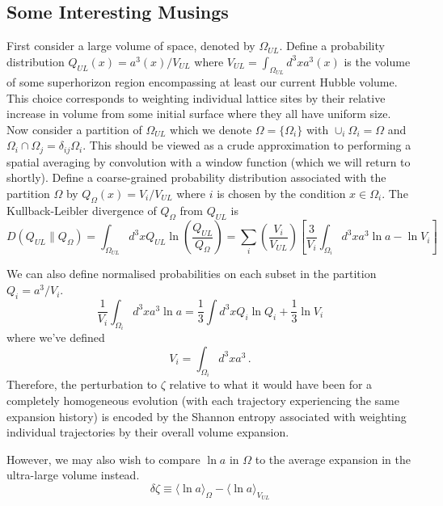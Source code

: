 \documentclass[11pt,a4paper]{article}
\begin{document}
\subsection{Some Interesting Musings}
First consider a large volume of space, denoted by $\Omega_{UL}$.
Define a probability distribution $Q_{UL}(x) = a^3(x) / V_{UL}$ where $V_{UL} = \int_{\Omega_{UL}}d^3x a^3(x)$ is the volume of some superhorizon region encompassing at least our current Hubble volume.
This choice corresponds to weighting individual lattice sites by their relative increase in volume from some initial surface where they all have uniform size.
Now consider a partition of $\Omega_{UL}$ which we denote $\Omega = \{\Omega_i\}$ with $\cup_i \Omega_i = \Omega$ and $\Omega_i \cap \Omega_j = \delta_{ij}\Omega_i$.
This should be viewed as a crude approximation to performing a spatial averaging by convolution with a window function (which we will return to shortly).
Define a coarse-grained probability distribution associated with the partition $\Omega$ by $Q_\Omega(x) = V_i / V_{UL}$ where $i$ is chosen by the condition $x \in \Omega_i$.
The Kullback-Leibler divergence of $Q_\Omega$ from $Q_{UL}$ is
\begin{equation}
  D(Q_{UL} \parallel Q_\Omega) = \int_{\Omega_{UL}} d^3x Q_{UL}\ln\left(\frac{Q_{UL}}{Q_\Omega}\right) = \sum_i \left(\frac{V_i}{V_{UL}}\right)\left[\frac{3}{V_i}\int_{\Omega_i}d^3xa^3\ln a -\ln V_i\right]
\end{equation}

We can also define normalised probabilities on each subset in the partition $Q_i = a^3 / V_i$.
\begin{equation}
  \frac{1}{V_i}\int_{\Omega_i} d^3x a^3\ln a = \frac{1}{3} \int d^3x Q_i\ln Q_i + \frac{1}{3}\ln V_i
\end{equation}
where we've defined
\begin{equation}
  V_i = \int_{\Omega_i} d^3x a^3 \, .
\end{equation}
Therefore, the perturbation to $\zeta$ relative to what it would have been for a completely homogeneous evolution (with each trajectory experiencing the same expansion history) is encoded by the Shannon entropy associated with weighting individual trajectories by their overall volume expansion.

However, we may also wish to compare $\ln a$ in $\Omega$ to the average expansion in the ultra-large volume instead.
\begin{equation}
  \delta\zeta \equiv \langle \ln a \rangle_\Omega - \langle \ln a \rangle_{V_{UL}}
\end{equation}
\end{document}
